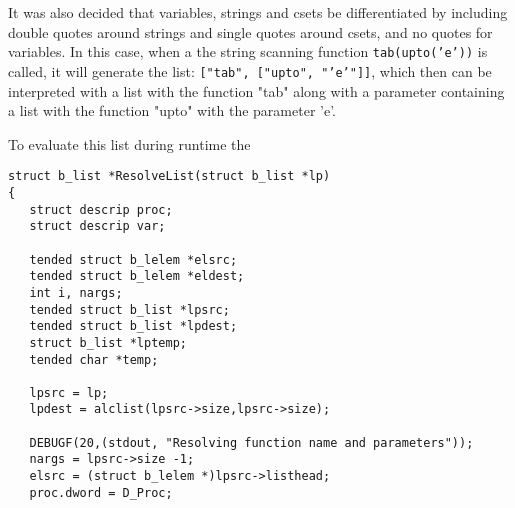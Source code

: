 \documentclass{article}
\begin{document}
It was also decided that variables, strings and csets be differentiated by including double quotes around strings and single quotes around csets, and no quotes for variables.  In this case, when a the string scanning function \texttt{tab(upto('e'))} is called, it will generate the list: \texttt{["tab", ["upto", "'e'"]]}, which then can be interpreted with a list with the function "tab" along with a parameter containing a list with the function "upto" with the parameter 'e'.

To evaluate this list during runtime the  
\begin{verbatim}
struct b_list *ResolveList(struct b_list *lp)
{
   struct descrip proc;
   struct descrip var;

   tended struct b_lelem *elsrc;
   tended struct b_lelem *eldest;
   int i, nargs;
   tended struct b_list *lpsrc;
   tended struct b_list *lpdest;
   struct b_list *lptemp;
   tended char *temp;
 
   lpsrc = lp;
   lpdest = alclist(lpsrc->size,lpsrc->size);

   DEBUGF(20,(stdout, "Resolving function name and parameters"));
   nargs = lpsrc->size -1;
   elsrc = (struct b_lelem *)lpsrc->listhead;
   proc.dword = D_Proc;


\end{verbatim}
\end{document}
